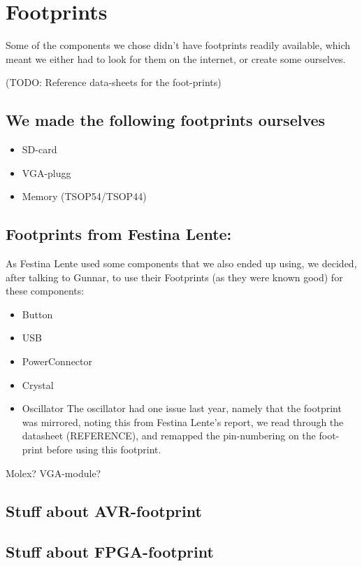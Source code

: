 \section {Footprints}
Some of the components we chose didn't have footprints readily available,
which meant we either had to look for them on the internet, or create some
ourselves.

(TODO: Reference data-sheets for the foot-prints)

\subsection {We made the following footprints ourselves}
\begin {itemize}
\item SD-card
\item VGA-plugg
\item Memory (TSOP54/TSOP44)
\end {itemize}

\subsection {Footprints from Festina Lente:}
As Festina Lente used some components that we also ended up using, we decided,
after talking to Gunnar, to use their Footprints (as they were known good) for these
components:
\begin {itemize}
\item Button
\item USB
\item PowerConnector
\item Crystal
\item Oscillator
The oscillator had one issue last year, namely that the footprint was mirrored,
noting this from Festina Lente's report, we read through the datasheet (REFERENCE),
and remapped the pin-numbering on the foot-print before using this footprint.
\end {itemize}
Molex?
VGA-module?

\subsection {Stuff about AVR-footprint}
\subsection {Stuff about FPGA-footprint}


